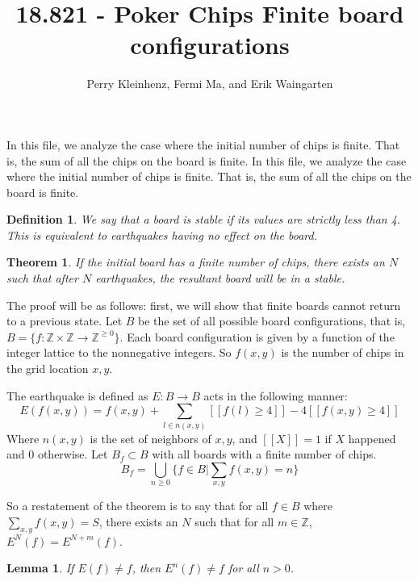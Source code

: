 \documentclass[11pt]{article}
\author{Perry Kleinhenz, Fermi Ma, and Erik Waingarten}
\title{18.821 - Poker Chips Finite board configurations}
\newtheorem{theorem}{Theorem}
\newtheorem{lemma}{Lemma}
\newtheorem{definition}{Definition}
\begin{document}
         
\maketitle

In this file, we analyze the case where the initial number of chips is finite. That is, the sum of all the chips on the board is finite. 
In this file, we analyze the case where the initial number of chips is finite.
 That is, the sum of all the chips on the board is finite. 

\begin{definition}
We say that a board is stable if its values are strictly less than 4. This is equivalent to earthquakes having no effect on the board. 
\end{definition}

\begin{theorem}
\label{finitestability}
If the initial board has a finite number of chips, there exists an $N$ such that after $N$ earthquakes, the resultant board will be in a stable.
\end{theorem}

The proof will be as follows: first, we will show that finite boards cannot return to a previous state. Let $B$ be the set of all possible board configurations, that is, $B = \{ f: \mathbb{Z} \times \mathbb{Z} \rightarrow \mathbb{Z}^{\geq 0}\}$. Each board configuration is given by a function of the integer lattice to the nonnegative integers. So $f(x,y)$ is the number of chips in the grid location $x,y$. 

The earthquake is defined as $E: B \rightarrow B$ acts in the following manner:
\[ E(f(x,y)) = f(x,y) + \sum_{l \in n(x,y)} [[ f(l) \geq 4 ]] - 4[[f(x,y) \geq 4]] \]
Where $n(x,y)$ is the set of neighbors of $x,y$, and $[[ X ]] = 1$ if $X$ happened and $0$ otherwise. Let $B_f \subset B$ with all boards with a finite number of chips. 
\[ B_f = \bigcup_{n \geq 0} \{ f \in B | \sum_{x,y} f(x,y) = n \} \]

So a restatement of the theorem is to say that for all $f \in B$ where $\sum_{x,y} f(x,y) = S$, there exists an $N$ such that for all $m \in \mathbb{Z}$, $E^N(f) = E^{N+m}(f)$. 

\begin{lemma}
If $E(f) \neq f$, then $E^n(f) \neq f$ for all $n > 0$.
\end{lemma}
\end{document}
